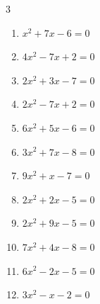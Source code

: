 \begin{multicols}{3}
\begin{enumerate}

  \item $x^{2}+7x-6=0$


  \item $4x^{2}-7x+2=0$


  \item $2x^{2}+3x-7=0$


\columnbreak %

  \item $2x^{2}-7x+2=0$


  \item $6x^{2}+5x-6=0$


  \item $3x^{2}+7x-8=0$


  \item $9x^{2}+x-7=0$


  \item $2x^{2}+2x-5=0$


  \item $2x^{2}+9x-5=0$


  \item $7x^{2}+4x-8=0$


\columnbreak %

  \item $6x^{2}-2x-5=0$


  \item $3x^{2}-x-2=0$


\end{enumerate}
\end{multicols}
